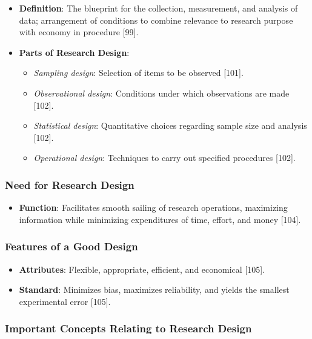 \documentclass[
]{article}
\providecommand{\tightlist}{%
  \setlength{\itemsep}{0pt}\setlength{\parskip}{0pt}}
\begin{document}
\begin{itemize}
\tightlist
\item
  \textbf{Definition}: The blueprint for the collection, measurement,
  and analysis of data; arrangement of conditions to combine relevance
  to research purpose with economy in procedure {[}99{]}.
\item
  \textbf{Parts of Research Design}:

  \begin{itemize}
  \tightlist
  \item
    \emph{Sampling design}: Selection of items to be observed {[}101{]}.
  \item
    \emph{Observational design}: Conditions under which observations are
    made {[}102{]}.
  \item
    \emph{Statistical design}: Quantitative choices regarding sample
    size and analysis {[}102{]}.
  \item
    \emph{Operational design}: Techniques to carry out specified
    procedures {[}102{]}.
  \end{itemize}
\end{itemize}

\subsubsection{Need for Research Design}\label{need-for-research-design}

\begin{itemize}
\tightlist
\item
  \textbf{Function}: Facilitates smooth sailing of research operations,
  maximizing information while minimizing expenditures of time, effort,
  and money {[}104{]}.
\end{itemize}

\subsubsection{Features of a Good
Design}\label{features-of-a-good-design}

\begin{itemize}
\tightlist
\item
  \textbf{Attributes}: Flexible, appropriate, efficient, and economical
  {[}105{]}.
\item
  \textbf{Standard}: Minimizes bias, maximizes reliability, and yields
  the smallest experimental error {[}105{]}.
\end{itemize}

\subsubsection{Important Concepts Relating to Research
Design}\label{important-concepts-relating-to-research-design}
\end{document}
